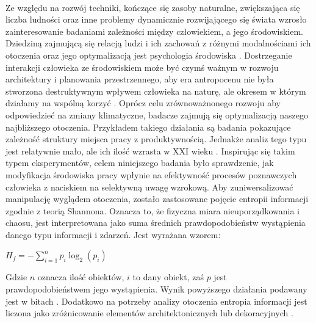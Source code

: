 \documentclass[12pt,a4paper,final,oneside,onecolumn,titlepage]{article}
\begin{document}
\paragraph{}
Ze względu na rozwój techniki, kończące się zasoby naturalne, zwiększająca się liczba ludności oraz inne problemy dynamicznie rozwijającego się świata wzrosło zainteresowanie badaniami zależności między człowiekiem, a jego środowiskiem. Dziedziną zajmującą się relacją ludzi i ich zachowań z różnymi modalnościami ich otoczenia oraz jego optymalizacją jest psychologia środowiska \citep{banka_psychologia_2018, gifford_environmental_2011}. Dostrzeganie interakcji człowieka ze środowiskiem może być czymś ważnym w rozwoju architektury i planowania przestrzennego, aby era antropocenu nie była stworzona destruktywnym wpływem człowieka na naturę, ale okresem w którym działamy na wspólną korzyć \citep{zalasiewicz_new_2010}. Oprócz celu zrównoważnonego rozwoju aby odpowiedzieć na zmiany klimatyczne, badacze zajmują się optymalizacją naszego najbliższego otoczenia. Przykładem takiego działania są badania \citet{lohr_interior_1996} pokazujące zależność struktury miejsca pracy z produktywnością. Jednakże analiz tego typu jest relatywnie mało, ale ich ilość wzrasta w XXI wieku \citep{spano_human_2020}. Inspirując się takim typem eksperymentów, celem niniejszego badania było sprawdzenie, jak modyfikacja środowiska pracy wpłynie na efektywność procesów poznawczych człowieka z naciskiem na selektywną uwagę wzrokową. Aby zuniwersalizować manipulację wyglądem otoczenia, zostało zastosowane pojęcie entropii informacji zgodnie z teorią Shannona. Oznacza to, że fizyczna miara nieuporządkowania i chaosu, jest interpretowana jako suma średnich prawdopodobieństw wystąpienia danego typu informacji i zdarzeń. Jest wyrażana wzorem:
\begin{center}
\begin{math}
H_f=-\displaystyle\sum_{i=1}^{n}p_i\log_2({p_i})
\end{math}
\end{center}
Gdzie $n$ oznacza ilość obiektów, $i$ to dany obiekt, zaś $p$ jest prawdopodobieństwem jego wystąpienia. Wynik powyższego działania podawany jest w bitach \citep{stamps_entropy_2004}. Dodatkowo na potrzeby analizy otoczenia entropia informacji jest liczona jako zróżnicowanie elementów architektonicznych lub dekoracyjnych \citep{stamps_entropy_2004, stamps_entropy_2002}.
\end{document}

